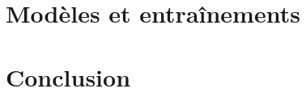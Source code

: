 \documentclass[a4paper, 12pt]{article}
\begin{document}
\section{Modèles et entraînements}

\section*{Conclusion}

\printbibliography
\end{document}
